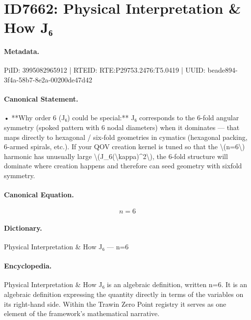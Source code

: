 \section*{ID7662: Physical Interpretation \& How J₆}
\paragraph{Metadata.}
PiID: 3995082965912 | RTEID: RTE:P29753.2476:T5.0419 | UUID: beade894-3f4a-58b7-8e2a-00200de47d42

\paragraph{Canonical Statement.}
• **Why order 6 (J₆) could be special:** J₆ corresponds to the 6-fold angular symmetry (spoked pattern with 6 nodal diameters) when it dominates — that maps directly to hexagonal / six-fold geometries in cymatics (hexagonal packing, 6-armed spirals, etc.). If your QOV creation kernel is tuned so that the \textbackslash{}(n=6\textbackslash{}) harmonic has unusually large \textbackslash{}(J\_6(\textbackslash{}kappa)\textasciicircum{}2\textbackslash{}), the 6-fold structure will dominate where creation happens and therefore can seed geometry with sixfold symmetry.

\paragraph{Canonical Equation.}
\[
n=6
\]

\paragraph{Dictionary.}
Physical Interpretation \& How J₆ — n=6

\paragraph{Encyclopedia.}
Physical Interpretation \& How J₆ is an algebraic definition, written n=6. It is an algebraic definition expressing the quantity directly in terms of the variables on its right-hand side. Within the Trawin Zero Point registry it serves as one element of the framework's mathematical narrative.
